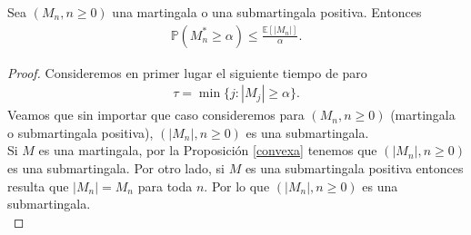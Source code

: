 \begin{theorem} 
\label{primera}
	Sea $(M_n, n \geq 0)$ una martingala o una submartingala positiva. Entonces
	\begin{align*}
		\mathbb{P}(M_n^{*} \geq \alpha) \leq \frac{\mathbb{E}[|M_n|]}{\alpha}.
	\end{align*}
\end{theorem}
\begin{proof}
	Consideremos en primer lugar el siguiente tiempo de paro
	\begin{align*}
		\tau = \min \{j : |M_j| \geq \alpha\}.
	\end{align*}
	Veamos que sin importar que caso consideremos para $(M_n, n \geq 0)$ (martingala o submartingala positiva), $(|M_n|, n \geq 0)$ es una submartingala. \\ 
	
	Si $M$ es una martingala, por la Proposición \ref{convexa} tenemos que $(|M_n|, n \geq 0)$ es una submartingala. Por otro lado, si $M$ es una submartingala positiva entonces resulta que $|M_n| = M_n$ para toda $n$. Por lo que $(|M_n|, n \geq 0)$ es una submartingala. \\
    

\end{proof}
